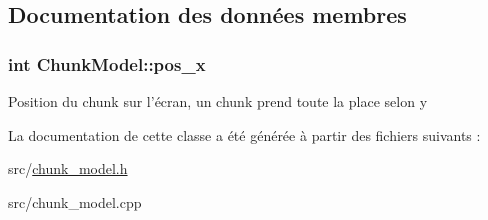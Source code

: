 \subsection{Documentation des données membres}
\hypertarget{class_chunk_model_a6b6f83cac17128250d32dddb026b4792}{
\subsubsection[{pos\+\_\+x}]{\setlength{\rightskip}{0pt plus 5cm}int Chunk\+Model\+::pos\+\_\+x}}\label{class_chunk_model_a6b6f83cac17128250d32dddb026b4792}
Position du chunk sur l'écran, un chunk prend toute la place selon y 

La documentation de cette classe a été générée à partir des fichiers suivants \+:\begin{DoxyCompactItemize}
\item 
src/\hyperlink{chunk__model_8h}{chunk\+\_\+model.\+h}\item 
src/chunk\+\_\+model.\+cpp\end{DoxyCompactItemize}
